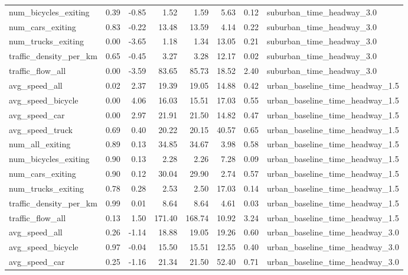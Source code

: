 \begin{table}[ht]
\begin{tabular}{lrrrrrrl}
  num\_bicycles\_exiting & 0.39 & -0.85 & 1.52 & 1.59 & 5.63 & 0.12 & suburban\_time\_headway\_3.0 \\ 
  num\_cars\_exiting & 0.83 & -0.22 & 13.48 & 13.59 & 4.14 & 0.22 & suburban\_time\_headway\_3.0 \\ 
  num\_trucks\_exiting & 0.00 & -3.65 & 1.18 & 1.34 & 13.05 & 0.21 & suburban\_time\_headway\_3.0 \\ 
  traffic\_density\_per\_km & 0.65 & -0.45 & 3.27 & 3.28 & 12.17 & 0.02 & suburban\_time\_headway\_3.0 \\ 
  traffic\_flow\_all & 0.00 & -3.59 & 83.65 & 85.73 & 18.52 & 2.40 & suburban\_time\_headway\_3.0 \\ 
  avg\_speed\_all & 0.02 & 2.37 & 19.39 & 19.05 & 14.88 & 0.42 & urban\_baseline\_time\_headway\_1.5 \\ 
  avg\_speed\_bicycle & 0.00 & 4.06 & 16.03 & 15.51 & 17.03 & 0.55 & urban\_baseline\_time\_headway\_1.5 \\ 
  avg\_speed\_car & 0.00 & 2.97 & 21.91 & 21.50 & 14.82 & 0.47 & urban\_baseline\_time\_headway\_1.5 \\ 
  avg\_speed\_truck & 0.69 & 0.40 & 20.22 & 20.15 & 40.57 & 0.65 & urban\_baseline\_time\_headway\_1.5 \\ 
  num\_all\_exiting & 0.89 & 0.13 & 34.85 & 34.67 & 3.98 & 0.58 & urban\_baseline\_time\_headway\_1.5 \\ 
  num\_bicycles\_exiting & 0.90 & 0.13 & 2.28 & 2.26 & 7.28 & 0.09 & urban\_baseline\_time\_headway\_1.5 \\ 
  num\_cars\_exiting & 0.90 & 0.12 & 30.04 & 29.90 & 2.74 & 0.57 & urban\_baseline\_time\_headway\_1.5 \\ 
  num\_trucks\_exiting & 0.78 & 0.28 & 2.53 & 2.50 & 17.03 & 0.14 & urban\_baseline\_time\_headway\_1.5 \\ 
  traffic\_density\_per\_km & 0.99 & 0.01 & 8.64 & 8.64 & 4.61 & 0.03 & urban\_baseline\_time\_headway\_1.5 \\ 
  traffic\_flow\_all & 0.13 & 1.50 & 171.40 & 168.74 & 10.92 & 3.24 & urban\_baseline\_time\_headway\_1.5 \\ 
  avg\_speed\_all & 0.26 & -1.14 & 18.88 & 19.05 & 19.26 & 0.60 & urban\_baseline\_time\_headway\_3.0 \\ 
  avg\_speed\_bicycle & 0.97 & -0.04 & 15.50 & 15.51 & 12.55 & 0.40 & urban\_baseline\_time\_headway\_3.0 \\ 
  avg\_speed\_car & 0.25 & -1.16 & 21.34 & 21.50 & 52.40 & 0.71 & urban\_baseline\_time\_headway\_3.0 \\ 

\end{tabular}
\end{table}
